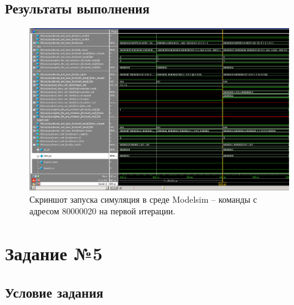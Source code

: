 \subsection*{Результаты выполнения}

\begin{figure}[h]
	\centering
	\includegraphics[height=0.42\textheight]{img/t4-modelsim}
	\caption{Скриншот запуска симуляция в среде Modelsim -- команды с адресом 80000020 на первой итерации.}
	\label{img:t4-modelsim}
\end{figure}

\section{Задание №5}

\subsection*{Условие задания}

